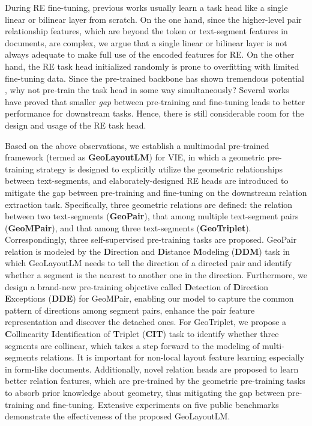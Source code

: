 \documentclass[10pt,twocolumn,letterpaper]{article}
\begin{document}
During RE fine-tuning, previous works usually learn a task head like a single linear or bilinear layer\cite{li2021structext,hong2022bros} from scratch.
On the one hand, since the higher-level pair relationship features, which are beyond the token or text-segment features in documents, are complex, we argue that a single linear or bilinear layer is not always adequate to make full use of the encoded features for RE.
On the other hand, the RE task head initialized randomly is prone to overfitting with limited fine-tuning data.
Since the pre-trained backbone has shown tremendous potential \cite{devlin2018bert, dosovitskiy2020image}, why not pre-train the task head in some way simultaneously? Several works \cite{hu2022p, han2021adaptive,liu2022prompt} have proved that smaller \textit{gap} between pre-training and fine-tuning leads to better performance for downstream tasks. Hence, there is still considerable room for the design and usage of the RE task head.

Based on the above observations, we establish a multimodal pre-trained framework (termed as \textbf{GeoLayoutLM}) for VIE, in which a geometric pre-training strategy is designed to explicitly utilize the geometric relationships between text-segments, and elaborately-designed RE heads are introduced to mitigate the gap between pre-training and fine-tuning on the downstream relation extraction task.
Specifically, three geometric relations are defined: the relation between two text-segments (\textbf{GeoPair}), that among multiple text-segment pairs (\textbf{GeoMPair}), and that among three text-segments (\textbf{GeoTriplet}).
Correspondingly, three self-supervised pre-training tasks are proposed.
GeoPair relation is modeled by the \textbf{D}irection and \textbf{D}istance \textbf{M}odeling (\textbf{DDM}) task in which GeoLayoutLM needs to tell the direction of a directed pair and identify whether a segment is the nearest to another one in the direction.
Furthermore, we design a brand-new pre-training objective called \textbf{D}etection of \textbf{D}irection \textbf{E}xceptions (\textbf{DDE}) for GeoMPair, enabling our model to capture the common pattern of directions among segment pairs, enhance the pair feature representation and discover the detached ones.
For GeoTriplet, we propose a \textbf{C}ollinearity \textbf{I}dentification of \textbf{T}riplet (\textbf{CIT}) task to identify whether three segments are collinear, which takes a step forward to the modeling of multi-segments relations. It is important for non-local layout feature learning especially in form-like documents.
Additionally, novel relation heads are proposed to learn better relation features,
which are pre-trained by the geometric pre-training tasks to absorb prior knowledge about geometry, thus mitigating the gap between pre-training and fine-tuning.
Extensive experiments on five public benchmarks demonstrate the effectiveness of the proposed GeoLayoutLM.
\end{document}
